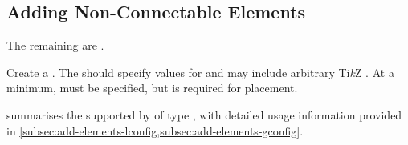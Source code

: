 \documentclass[10pt,british,a4paper]{ltxdoc}
\newcommand*\pkg[1]{\textpkg{#1}}
\newcommand*\TikZ{Ti\emph{k}Z}
\begin{document}


\subsection{Adding Non-Connectable Elements}\label{subsec:macros-non-connectable-elements}

The remaining \elementslabelname{} are .

\DescribeMacro{\chronostheorycircle} \AfterLastParam %
Create a .
The  should specify values for \pkg{chronos} \keyslabelname{} and may include arbitrary \TikZ{} \keyslabelname{}.
At a minimum,  must be specified, but  is required for placement.

 summarises the \pkg{chronos} \keyslabelname{} supported by \elementslabelname{} of type , with detailed usage information provided in \cref{subsec:add-elements-lconfig,subsec:add-elements-gconfig}.
\end{document}
